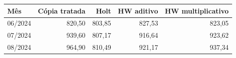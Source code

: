 \begin{tabular}{lrrrr}
\toprule
Mês & Cópia tratada & Holt & HW aditivo & HW multiplicativo \\
\midrule
06/2024 & 820,50 & 803,85 & 827,53 & 823,05 \\
07/2024 & 939,60 & 807,17 & 916,64 & 923,62 \\
08/2024 & 964,90 & 810,49 & 921,17 & 937,34 \\
\bottomrule
\end{tabular}
